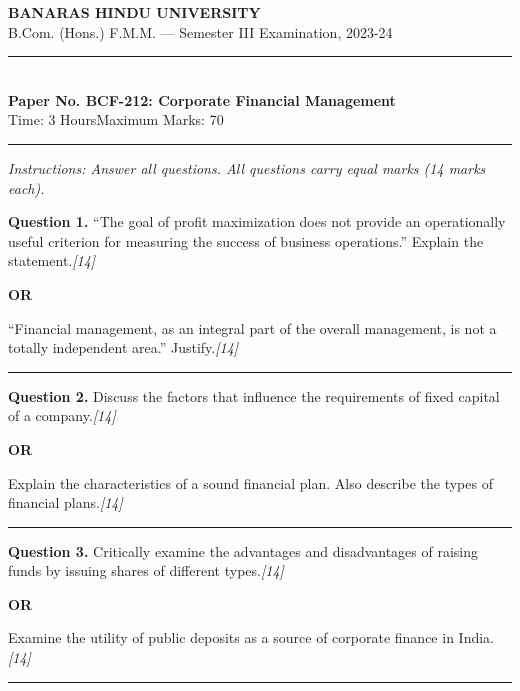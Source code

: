\documentclass[11pt,a4paper]{article}
\newcommand{\pts}[1]{\hfill   \textit{[#1]}}
\begin{document}
\begin{center}
  {\large\bfseries BANARAS HINDU UNIVERSITY}\\[2pt]
  {\normalsize B.Com. (Hons.) F.M.M. --- Semester III Examination, 2023-24}\\[6pt]
  \rule{0.8\linewidth}{0.5pt}\\[6pt]
  {\large\bfseries Paper No. BCF-212: Corporate Financial Management}\\[4pt]
  {\normalsize Time: 3 Hours\hfill Maximum Marks: 70}
\end{center}

\rule{\linewidth}{0.4pt}

\smallskip



\noindent   \textit{Instructions: Answer all questions. All questions carry equal marks (14 marks each).}

\bigskip




\noindent   \textbf{Question 1.}
``The goal of profit maximization does not provide an operationally useful criterion for measuring the success of business operations.'' Explain the statement.\pts{14}

\centerline{   \textbf{OR}}

``Financial management, as an integral part of the overall management, is not a totally independent area.'' Justify.\pts{14}

\medskip\rule{\linewidth}{0.2pt}




\noindent   \textbf{Question 2.}
Discuss the factors that influence the requirements of fixed capital of a company.\pts{14}

\centerline{   \textbf{OR}}

Explain the characteristics of a sound financial plan. Also describe the types of financial plans.\pts{14}

\medskip\rule{\linewidth}{0.2pt}




\noindent   \textbf{Question 3.}
Critically examine the advantages and disadvantages of raising funds by issuing shares of different types.\pts{14}

\centerline{   \textbf{OR}}

Examine the utility of public deposits as a source of corporate finance in India.\pts{14}

\medskip\rule{\linewidth}{0.2pt}
\end{document}
